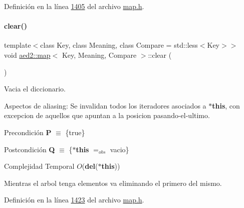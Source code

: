 Definición en la línea \hyperlink{map_8h_source_l01405}{1405} del archivo \hyperlink{map_8h_source}{map.\+h}.

\mbox{\label{classaed2_1_1map_a2bfa5165825979bf2431db55bc6bc9ca_a2bfa5165825979bf2431db55bc6bc9ca}} 
\paragraph{\texorpdfstring{clear()}{clear()}}
{\footnotesize\ttfamily template$<$class Key, class Meaning, class Compare = std\+::less$<$\+Key$>$$>$ \\
void \hyperlink{classaed2_1_1map}{aed2\+::map}$<$ Key, Meaning, Compare $>$\+::clear (\begin{DoxyParamCaption}{ }\end{DoxyParamCaption})\hspace{0.3cm}{\ttfamily [inline]}}



Vacia el diccionario. 

\begin{DoxyParagraph}{Aspectos de aliasing\+:}
Se invalidan todos los iteradores asociados a {\bfseries $\ast$this}, con excepcion de aquellos que apuntan a la posicion pasando-\/el-\/ultimo.
\end{DoxyParagraph}
\begin{DoxyPrecond}{Precondición}
{\bfseries P} $\equiv$ \{true\} 
\end{DoxyPrecond}
\begin{DoxyPostcond}{Postcondición}
{\bfseries Q} $\equiv$ \{{\bfseries $\ast$this} $=_{obs}$ vacio\}
\end{DoxyPostcond}

\begin{DoxyDescription}
\item[Complejidad Temporal]$O$({\bfseries del}({\bfseries $\ast$this}))
\end{DoxyDescription}

Mientras el arbol tenga elementos va eliminando el primero del mismo. 

Definición en la línea \hyperlink{map_8h_source_l01423}{1423} del archivo \hyperlink{map_8h_source}{map.\+h}.

\mbox{\label{classaed2_1_1map_a43ddb71cc91e5c6021a7a1f243d6cc4a_a43ddb71cc91e5c6021a7a1f243d6cc4a}} 
